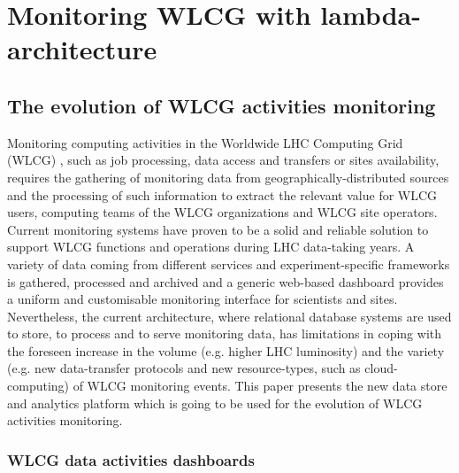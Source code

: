 \chapter{Monitoring WLCG with lambda-architecture} \label{lambda-eva}


\section{The evolution of WLCG activities monitoring} \label{lambda-intro}

Monitoring computing activities in the Worldwide LHC Computing Grid (WLCG)
\cite{wlcg}, such as job processing, data access and transfers or sites
availability, requires the gathering of monitoring data from
geographically-distributed sources and the processing of such information to
extract the relevant value for WLCG users, computing teams of the WLCG
organizations and WLCG site operators.  Current monitoring systems have proven to be
a solid and reliable solution to support WLCG functions and operations during
LHC data-taking years.  A variety of data coming from different services and
experiment-specific frameworks is gathered, processed and archived and a
generic web-based dashboard provides a uniform and customisable monitoring
interface for scientists and sites. Nevertheless, the current architecture,
where relational database systems are used to store, to process and to serve
monitoring data, has limitations in coping with the foreseen increase in the
volume (e.g.  higher LHC luminosity) and the variety (e.g. new data-transfer
protocols and new resource-types, such as cloud-computing) of WLCG monitoring
events. This paper presents the new data store and analytics platform which is
going to be used for the evolution of WLCG activities monitoring.

\subsection{WLCG data activities dashboards} 

